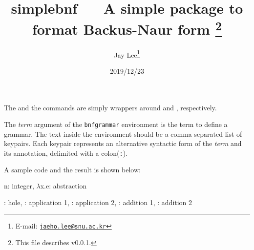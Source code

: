 \documentclass[a4paper]{article}
\title{%
  \textsf{simplebnf} --- A simple package to format Backus-Naur form%
  \footnote{This file describes v0.0.1.}}
\author{Jay Lee\footnote{E-mail: %
  \href{mailto:jaeho.lee@snu.ac.kr}{\texttt{jaeho.lee@snu.ac.kr}}}}
\date{2019/12/23}
\begin{document}
\maketitle

\begin{presentcommand}
   
\end{presentcommand}
The  and the  commands are simply wrappers around
 and , respectively.

\begin{presentcommand}
\end{presentcommand}
The \textit{term} argument of the \texttt{bnfgrammar} environment is the term
to define a grammar.
The text inside the environment should be a comma-separated list of keypairs.
Each keypair represents an alternative syntactic form of the \textit{term} and
its annotation, delimited with a colon(\verb/:/).

A sample code and the result is shown below:
\begin{exampleside}
\begin{bnfgrammar}{}
  n: integer,
  $\lambda$x.e: abstraction
\end{bnfgrammar}

\begin{bnfgrammar}{}
  \bnfexpr{[]}: hole,
  : application 1,
  : application 2,
  : addition 1,
  : addition 2
\end{bnfgrammar}
\end{exampleside}
\end{document}
